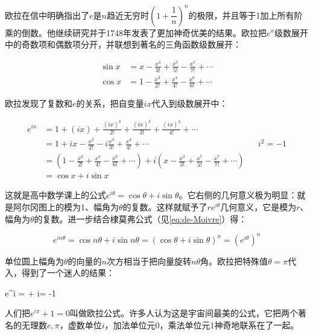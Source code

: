 \documentclass[b5paper]{ctexart}
\begin{document}
欧拉在信中明确指出了$e$是$n$趋近无穷时$(1 + \dfrac{1}{n})^n$的极限，并且等于1加上所有阶乘的倒数。他继续研究并于1748年发表了更加神奇优美的结果。欧拉把$e^x$级数展开中的奇数项和偶数项分开，并联想到著名的三角函数级数展开：

\begin{align*}
\sin x &= x - \frac{x^3}{3!} + \frac{x^5}{5!} - \frac{x^7}{7!} + \dotsb \\
\cos x &= 1 - \frac{x^2}{2!} + \frac{x^4}{4!} - \frac{x^6}{6!} + \dotsb
\end{align*}

欧拉发现了复数和$e$的关系，把自变量$ix$代入到级数展开中：

\begin{align*}
e^{ix} &= 1 + (ix) + \frac{(ix)^2}{2!} + \frac{(ix)^3}{3!} + \frac{(ix)^4}{4!} + \dotsb \\
  &= 1 + ix - \frac{x^2}{2!} - i\frac{x^3}{3!} + \frac{x^4}{4!} + \dotsb && i^2 = -1\\
  &= (1 - \frac{x^2}{2!} + \frac{x^4}{4!} - \frac{x^6}{6!} + \dotsb) + i(x - \frac{x^3}{3!} + \frac{x^5}{5!} - \frac{x^7}{7!} + \dotsb ) \\
  &= \cos x + i\sin x
\end{align*}

这就是高中数学课上的公式$e^{i\theta} = \cos \theta + i\sin \theta$。它右侧的几何意义极为明显：就是阿尔冈图上的模为1、幅角为$\theta$的复数。这样就赋予了$re^{i\theta}$几何意义，它是模为$r$、幅角为$\theta$的复数。进一步结合棣莫弗公式（见\cref{eq:de-Moivre}）得：

\[
e^{in\theta} = \cos n\theta + i\sin n\theta = (\cos \theta + i\sin \theta)^n = (e^{i\theta})^n
\]

单位圆上幅角为$\theta$的向量的$n$次方相当于把向量旋转$n\theta$角。欧拉把特殊值$\theta = \pi$代入，得到了一个迷人的结果：

\be \label{eq:euler}
e^{i\pi} = \cos \pi + i\sin \pi = -1
\ee

人们把$e^{i\pi} + 1 = 0$叫做欧拉公式。许多人认为这是宇宙间最美的公式，它把两个著名的无理数$e, \pi$，虚数单位$i$，加法单位元0，乘法单位元1神奇地联系在了一起。
\end{document}
